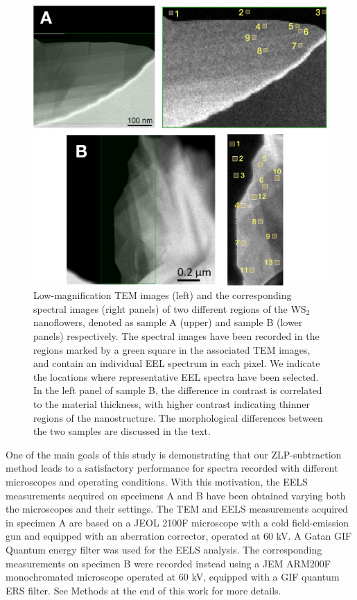 \begin{figure}[h]
\begin{centering}
  \includegraphics[width=0.87\linewidth]{plots/Spectra_location2.pdf}
  \caption{Low-magnification TEM images (left) and the corresponding
    spectral images (right panels) of two different regions of
    the WS$_2$ nanoflowers, denoted as sample A (upper) and sample B (lower panels) respectively.
    The spectral images have been recorded in the regions marked by a green square
    in the associated TEM images, and contain an individual EEL spectrum in each pixel.
    We indicate the locations where representative
    EEL spectra have been selected. 
    In the left panel of sample B, the difference in contrast is correlated to the material
    thickness, with higher contrast indicating thinner regions of the nanostructure.
    The morphological differences between the two samples are discussed in the text.
  }
\label{fig:ws2positions}
\end{centering}
\end{figure}

One of the main goals of this study is demonstrating that our ZLP-subtraction method leads to
a satisfactory performance for spectra recorded with different microscopes and operating conditions.
%
With this motivation, the EELS measurements acquired on specimens A and B have
been obtained varying both the microscopes and their settings.
%
The TEM and EELS measurements acquired in specimen A  are based on a JEOL 2100F
microscope with a cold field-emission gun and equipped with an aberration corrector,
operated at 60 kV. A Gatan GIF Quantum energy filter was used for
the EELS analysis.
%
The corresponding measurements on specimen B were recorded instead
using a JEM ARM200F monochromated microscope operated at 60 kV, equipped with a GIF quantum ERS filter.
%
See Methods at the end of this work for more details.\\

